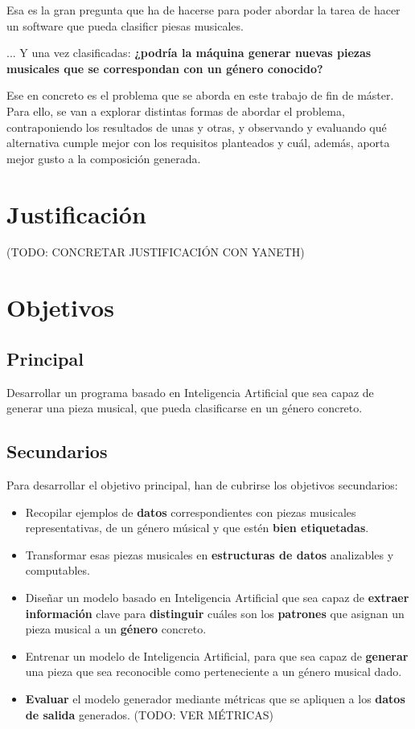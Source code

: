 Esa es la gran pregunta que ha de hacerse para poder abordar la tarea de hacer un software que pueda clasificr piesas musicales.

... Y una vez clasificadas: \textbf{¿podría la máquina generar nuevas piezas musicales que se correspondan con un género conocido?}

Ese en concreto es el problema que se aborda en este trabajo de fin de máster. Para ello, se van a explorar distintas formas de abordar el problema, contraponiendo los resultados de unas y otras, y observando y evaluando qué alternativa cumple mejor con los requisitos planteados y cuál, además, aporta mejor gusto a la composición generada.


\section{Justificación}
(TODO: CONCRETAR JUSTIFICACIÓN CON YANETH)

\section{Objetivos}
\subsection{Principal}
\label{objetivo-principal}
Desarrollar un programa basado en Inteligencia Artificial que sea capaz de generar una pieza musical, que pueda clasificarse en un género concreto.

\subsection{Secundarios}

Para desarrollar el objetivo principal, han de cubrirse los objetivos secundarios:

\begin{itemize}
    \item Recopilar ejemplos de \textbf{datos} correspondientes con piezas musicales representativas, de un género músical y que estén \textbf{bien etiquetadas}.
    
    \item Transformar esas piezas musicales en \textbf{estructuras de datos} analizables y computables.

    \item Diseñar un modelo basado en Inteligencia Artificial que sea capaz de \textbf{extraer información} clave para \textbf{distinguir} cuáles son los \textbf{patrones} que asignan un pieza musical a un \textbf{género} concreto.

    \item Entrenar un modelo de Inteligencia Artificial, para que sea capaz de \textbf{generar} una pieza que sea reconocible como perteneciente a un género musical dado.

    \item \textbf{Evaluar} el modelo generador mediante métricas que se apliquen a los \textbf{datos de salida} generados. (TODO: VER MÉTRICAS)
\end{itemize}


